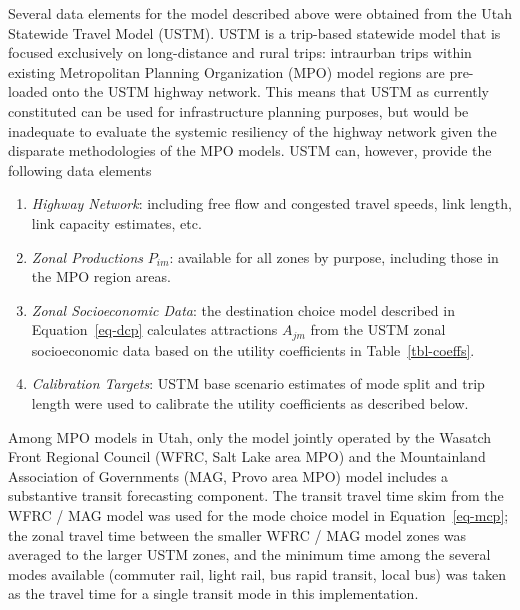 \documentclass[
  letterpaper,
  number,
  review,
  3p]{elsarticle}
\providecommand{\tightlist}{%
  \setlength{\itemsep}{0pt}\setlength{\parskip}{0pt}}\usepackage{longtable,booktabs,array}
\begin{document}
Several data elements for the model described above were obtained from
the Utah Statewide Travel Model (USTM). USTM is a trip-based statewide
model that is focused exclusively on long-distance and rural trips:
intraurban trips within existing Metropolitan Planning Organization
(MPO) model regions are pre-loaded onto the USTM highway network. This
means that USTM as currently constituted can be used for infrastructure
planning purposes, but would be inadequate to evaluate the systemic
resiliency of the highway network given the disparate methodologies of
the MPO models. USTM can, however, provide the following data elements

\begin{enumerate}
\def\labelenumi{\arabic{enumi}.}
\tightlist
\item
  \emph{Highway Network}: including free flow and congested travel
  speeds, link length, link capacity estimates, etc.
\item
  \emph{Zonal Productions} \(P_{im}\): available for all zones by
  purpose, including those in the MPO region areas.
\item
  \emph{Zonal Socioeconomic Data}: the destination choice model
  described in Equation~\ref{eq-dcp} calculates attractions \(A_{jm}\)
  from the USTM zonal socioeconomic data based on the utility
  coefficients in Table~\ref{tbl-coeffs}.
\item
  \emph{Calibration Targets}: USTM base scenario estimates of mode split
  and trip length were used to calibrate the utility coefficients as
  described below.
\end{enumerate}

Among MPO models in Utah, only the model jointly operated by the Wasatch
Front Regional Council (WFRC, Salt Lake area MPO) and the Mountainland
Association of Governments (MAG, Provo area MPO) model includes a
substantive transit forecasting component. The transit travel time skim
from the WFRC / MAG model was used for the mode choice model in
Equation~\ref{eq-mcp}; the zonal travel time between the smaller WFRC /
MAG model zones was averaged to the larger USTM zones, and the minimum
time among the several modes available (commuter rail, light rail, bus
rapid transit, local bus) was taken as the travel time for a single
transit mode in this implementation.
\end{document}
